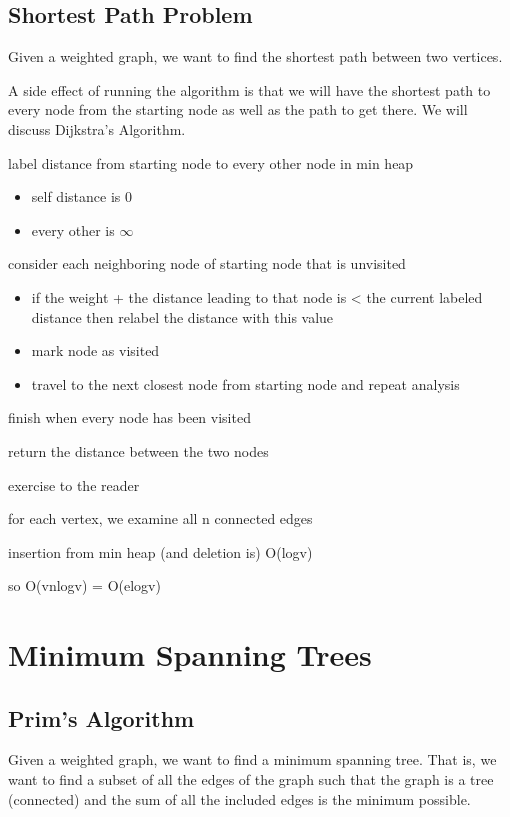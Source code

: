 \section{Shortest Path Problem}
Given a weighted graph, we want to find the shortest path between two vertices.
 
A side effect of running the algorithm is that we will have the shortest path to every node from the starting node as well as the path to get there. We will discuss Dijkstra's Algorithm.

\algorithm
{
    \item label distance from starting node to every other node in min heap
    \begin{itemize}
        \item self distance is 0
        \item every other is $\infty$
    \end{itemize}
    \item consider each neighboring node of starting node that is unvisited
    \begin{itemize}
        \item if the weight + the distance leading to that node is < the current labeled distance then relabel the distance with this value
        \item mark node as visited
        \item travel to the next closest node from starting node and repeat analysis
    \end{itemize}
    \item finish when every node has been visited
    \item return the distance between the two nodes
}
{
    \item exercise to the reader
}
{
    \item for each vertex, we examine all n connected edges 
    \item  insertion from min heap (and deletion is) O(logv) 
    \item so O(vnlogv) = O(elogv)

}




\chapter{Minimum Spanning Trees}

\section{Prim's Algorithm}
Given a weighted graph, we want to find a minimum spanning tree. That is, we want to find a subset of all the edges of the graph such that the graph is a tree (connected) and the sum of all the included edges is the minimum possible.
 

